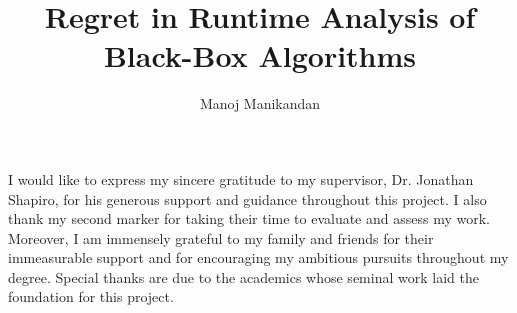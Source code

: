 \documentclass[10pt,BSc,wordcount,twoside]{muthesis}
\begin{document}

\title{Regret in Runtime Analysis of Black-Box Algorithms}
\author{Manoj Manikandan}

\beforeabstract



\afterabstract

I would like to express my sincere gratitude to my supervisor, Dr.
Jonathan Shapiro, for his generous support and guidance
throughout this project. I also thank my second marker for taking
their time to evaluate and assess my work. Moreover, I am
immensely grateful to my family and friends for their immeasurable
support and for encouraging my ambitious pursuits throughout my degree.
Special thanks are due to the academics whose seminal work laid the
foundation for this project.
\afterpreface

\printnoidxglossary[type=\acronymtype, title=Abbreviations and Acronyms,
toctitle=Abbreviations and Acronyms]

{%
  \let\oldglossarysection\glossarysection
  \renewcommand*{\glossarysection}[2][]{
  \section*{#2}}%
  \printnoidxglossary[title=Glossary]
  \let\glossarysection\oldglossarysection
}















\end{document}
